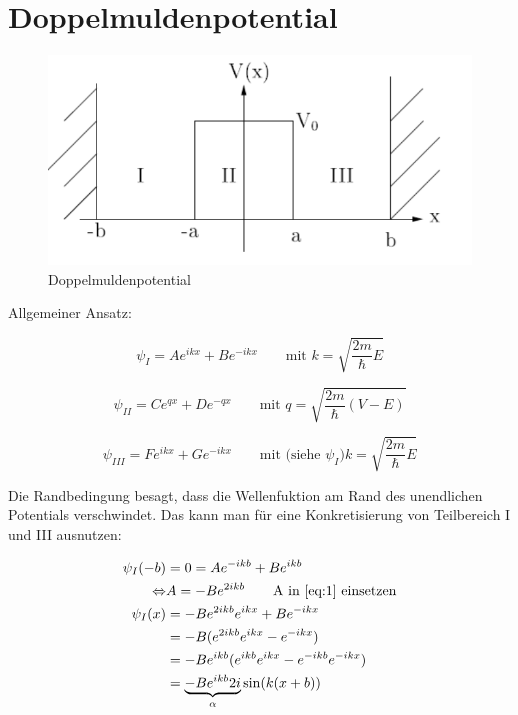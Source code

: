



\setcounter{section}{1}
\section*{Doppelmuldenpotential}

\begin{figure}[htbp]
  \centering
  \includegraphics{./sgl_doppelmuldenpotential_pics/pic01_v.pdf}
  \caption{Doppelmuldenpotential}
  \label{fig:fg1}
\end{figure}

Allgemeiner Ansatz:

\begin{equation}
  \label{eq:1}
  \psi_I = Ae^{ikx}+Be^{-ikx} \qquad \text{mit } k = \sqrt{\frac{2m}{\hbar}E}
\end{equation}

\begin{equation}
  \label{eq:2}
  \psi_{II} = Ce^{q x}+De^{-qx}\qquad \text{mit } q = \sqrt{\frac{2m}{\hbar}(V-E)}
\end{equation}

\begin{equation}
  \label{eq:3}
  \psi_{III} = Fe^{ikx}+Ge^{-ikx}\qquad \text{mit (siehe }\psi_{I}) k = \sqrt{\frac{2m}{\hbar}E}
\end{equation}


Die Randbedingung besagt, dass die Wellenfuktion am Rand des unendlichen  Potentials verschwindet. Das kann man für eine Konkretisierung von Teilbereich I und III ausnutzen:

\begin{align}
  \label{eq:4}
  \psi_{I}(-b) &= 0 = Ae^{-ikb}+Be^{ikb} \\
\Leftrightarrow & A = -Be^{2ikb}\qquad\text{A in }\ref{eq:1}\text{ einsetzen}\\
\psi_I(x)&=-Be^{2ikb}e^{ikx}+Be^{-ikx} \\
&=-B(e^{2ikb}e^{ikx}-e^{-ikx})\\
&=-B e^{ikb}(e^{ikb}e^{ikx}-e^{-ikb}e^{-ikx})\\
&=\underbrace{-B e^{ikb}2i}_{\alpha}\sin(k(x+b))
\end{align}

